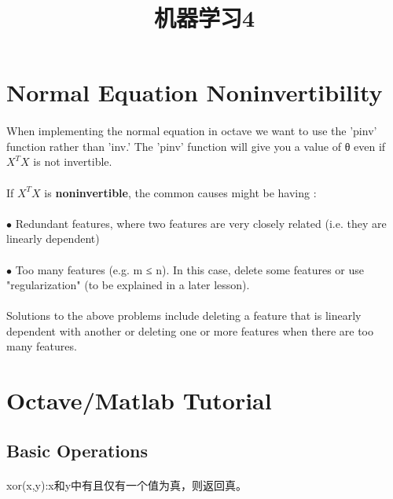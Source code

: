 \documentclass{article}
\begin{document}
\begin{CJK}{UTF8}{gbsn}
\title{机器学习4}
\date{}
\maketitle
\section{Normal Equation Noninvertibility}
\paragraph{}
When implementing the normal equation in octave we want to use the 'pinv' function rather than 'inv.' The 'pinv' function will give you a value of θ even if $X^{T} X $ is not invertible.
\paragraph{}
If $X^{T} X$ is \textbf{noninvertible}, the common causes might be having :
\paragraph{}
$\bullet$ Redundant features, where two features are very closely related (i.e. they are linearly dependent)
\paragraph{}
$\bullet$ Too many features (e.g. m ≤ n). In this case, delete some features or use "regularization" (to be explained in a later lesson).
\paragraph{}
Solutions to the above problems include deleting a feature that is linearly dependent with another or deleting one or more features when there are too many features.
\section{Octave/Matlab Tutorial}
\subsection{Basic Operations}
\paragraph{}
xor(x,y):x和y中有且仅有一个值为真，则返回真。

\end{CJK}
\end{document}
